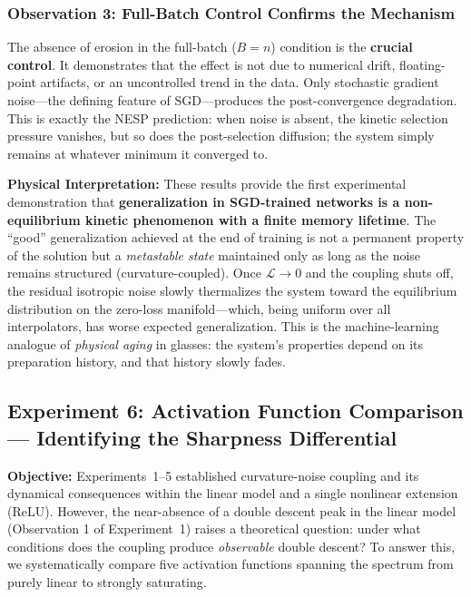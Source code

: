 \documentclass[
  journal=largetwo,
  simfonts=false,
  year=2025,
  volume=37,
]{cup-journal}
\begin{document}
\subsubsection{Observation 3: Full-Batch Control Confirms the Mechanism}

The absence of erosion in the full-batch ($B=n$) condition is the \textbf{crucial control}. It demonstrates that the effect is not due to numerical drift, floating-point artifacts, or an uncontrolled trend in the data. Only stochastic gradient noise---the defining feature of SGD---produces the post-convergence degradation. This is exactly the NESP prediction: when noise is absent, the kinetic selection pressure vanishes, but so does the post-selection diffusion; the system simply remains at whatever minimum it converged to.

\textbf{Physical Interpretation:} These results provide the first experimental demonstration that \textbf{generalization in SGD-trained networks is a non-equilibrium kinetic phenomenon with a finite memory lifetime}. The ``good'' generalization achieved at the end of training is not a permanent property of the solution but a \textit{metastable state} maintained only as long as the noise remains structured (curvature-coupled). Once $\mathcal{L} \to 0$ and the coupling shuts off, the residual isotropic noise slowly thermalizes the system toward the equilibrium distribution on the zero-loss manifold---which, being uniform over all interpolators, has worse expected generalization. This is the machine-learning analogue of \textit{physical aging} in glasses: the system's properties depend on its preparation history, and that history slowly fades.

\subsection{Experiment 6: Activation Function Comparison --- Identifying the Sharpness Differential}

\textbf{Objective:} Experiments~1--5 established curvature-noise coupling and its dynamical consequences within the linear model and a single nonlinear extension (ReLU). However, the near-absence of a double descent peak in the linear model (Observation 1 of Experiment~1) raises a theoretical question: under what conditions does the coupling produce \textit{observable} double descent? To answer this, we systematically compare five activation functions spanning the spectrum from purely linear to strongly saturating.
\end{document}
